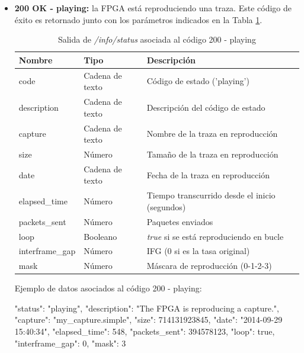 \begin{itemize}
\item{\textbf{200 OK - playing:} la \gls{FPGA} está reproduciendo una \gls{traza}. Este código de éxito es retornado junto con los parámetros indicados en la Tabla \ref{extra:api:infostatus:playing}.
\begin{table}[H]
\centering
\begin{tabular}{|l|l|l|}
\hline
\rowcolor[HTML]{F5F5F5}
\textbf{Nombre}  & \textbf{Tipo}   & \textbf{Descripción}                            \\ \hline
code             & Cadena de texto & Código de estado ('playing')                    \\ \hline
description      & Cadena de texto & Descripción del código de estado                \\ \hline
capture          & Cadena de texto & Nombre de la \gls{traza} en reproducción        \\ \hline
size             & Número          & Tamaño de la \gls{traza} en reproducción        \\ \hline
date             & Cadena de texto & Fecha de la \gls{traza} en reproducción         \\ \hline
elapsed\_time    & Número          & Tiempo transcurrido desde el inicio (segundos)  \\ \hline
packets\_sent    & Número          & Paquetes enviados                               \\ \hline
loop             & Booleano        & \textit{true} si se está reproduciendo en bucle \\ \hline
interframe\_gap  & Número          & \gls{IFG} (0 si es la tasa original)            \\ \hline
mask             & Número          & Máscara de reproducción (0-1-2-3)               \\ \hline
\end{tabular}
\caption{Salida de \textit{/info/status} asociada al código 200 - playing}
\label{extra:api:infostatus:playing}
\end{table}
\begin{minipage}{\textwidth}
Ejemplo de datos asociados al código 200 - playing:

\begin{code}[language=json]
{
  "status": "playing",
  "description": "The FPGA is reproducing a capture.",
  "capture": "my_capture.simple",
  "size": 714131923845,
  "date": "2014-09-29 15:40:34",
  "elapsed_time": 548,
  "packets_sent": 394578123,
  "loop": true,
  "interframe_gap": 0,
  "mask": 3
}
\end{code}
\end{minipage}
}


\end{itemize}
